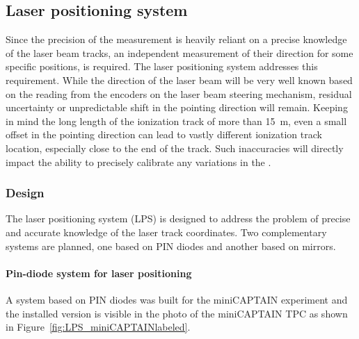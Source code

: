 
\subsection{Laser positioning system}
\label{sec:calib-laser-pos}

Since the precision of the \efield measurement is heavily reliant on a precise knowledge of the laser beam tracks, an independent measurement of their direction for some specific positions, is required. The laser positioning system addresses this requirement.
While the direction of the laser beam will be very well known based on the reading from the encoders on the laser beam steering mechanism,  residual uncertainty or unpredictable shift in the pointing direction will remain. 
Keeping in mind the long length of the ionization track of more than \SI{15}{\m}, even a small offset in the pointing direction can lead to vastly different ionization track location, especially close to the end of the track. Such inaccuracies will directly impact the ability to precisely calibrate any variations in the \efield.

\subsubsection{Design}

The laser positioning system (LPS) is designed to address the problem of precise and accurate knowledge of the laser track coordinates. %
Two complementary systems are planned, one based on PIN diodes and another based on mirrors.

\paragraph{Pin-diode system for laser positioning}

A system based on PIN diodes 
was built for the miniCAPTAIN experiment  and the installed version is visible in the photo of the miniCAPTAIN TPC as shown in  Figure~\ref{fig:LPS_miniCAPTAINlabeled}.  


